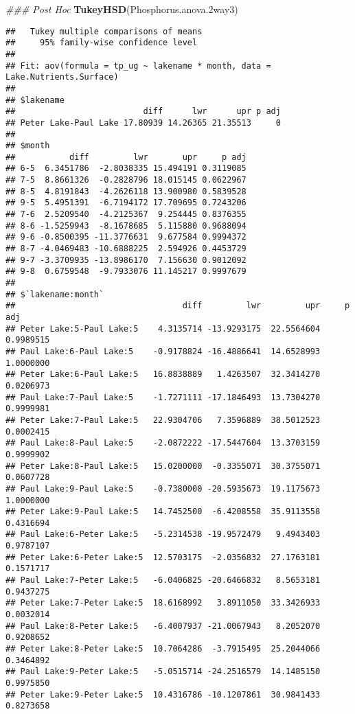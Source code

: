 \documentclass[]{article}
\newenvironment{Shaded}{\begin{snugshade}}{\end{snugshade}}
\newcommand{\CommentTok}[1]{\textcolor[rgb]{0.56,0.35,0.01}{\textit{#1}}}
\newcommand{\FloatTok}[1]{\textcolor[rgb]{0.00,0.00,0.81}{#1}}
\newcommand{\KeywordTok}[1]{\textcolor[rgb]{0.13,0.29,0.53}{\textbf{#1}}}
\newcommand{\NormalTok}[1]{#1}
\begin{document}
\begin{Shaded}
\begin{Highlighting}[]
\CommentTok{### Post Hoc}
\KeywordTok{TukeyHSD}\NormalTok{(Phosphorus.anova}\FloatTok{.2}\NormalTok{way3)}
\end{Highlighting}
\end{Shaded}

\begin{verbatim}
##   Tukey multiple comparisons of means
##     95% family-wise confidence level
## 
## Fit: aov(formula = tp_ug ~ lakename * month, data = Lake.Nutrients.Surface)
## 
## $lakename
##                          diff      lwr      upr p adj
## Peter Lake-Paul Lake 17.80939 14.26365 21.35513     0
## 
## $month
##           diff         lwr       upr     p adj
## 6-5  6.3451786  -2.8038335 15.494191 0.3119085
## 7-5  8.8661326  -0.2828796 18.015145 0.0622967
## 8-5  4.8191843  -4.2626118 13.900980 0.5839528
## 9-5  5.4951391  -6.7194172 17.709695 0.7243206
## 7-6  2.5209540  -4.2125367  9.254445 0.8376355
## 8-6 -1.5259943  -8.1678685  5.115880 0.9688094
## 9-6 -0.8500395 -11.3776631  9.677584 0.9994372
## 8-7 -4.0469483 -10.6888225  2.594926 0.4453729
## 9-7 -3.3709935 -13.8986170  7.156630 0.9012092
## 9-8  0.6759548  -9.7933076 11.145217 0.9997679
## 
## $`lakename:month`
##                                  diff         lwr         upr     p adj
## Peter Lake:5-Paul Lake:5    4.3135714 -13.9293175  22.5564604 0.9989515
## Paul Lake:6-Paul Lake:5    -0.9178824 -16.4886641  14.6528993 1.0000000
## Peter Lake:6-Paul Lake:5   16.8838889   1.4263507  32.3414270 0.0206973
## Paul Lake:7-Paul Lake:5    -1.7271111 -17.1846493  13.7304270 0.9999981
## Peter Lake:7-Paul Lake:5   22.9304706   7.3596889  38.5012523 0.0002415
## Paul Lake:8-Paul Lake:5    -2.0872222 -17.5447604  13.3703159 0.9999902
## Peter Lake:8-Paul Lake:5   15.0200000  -0.3355071  30.3755071 0.0607728
## Paul Lake:9-Paul Lake:5    -0.7380000 -20.5935673  19.1175673 1.0000000
## Peter Lake:9-Paul Lake:5   14.7452500  -6.4208558  35.9113558 0.4316694
## Paul Lake:6-Peter Lake:5   -5.2314538 -19.9572479   9.4943403 0.9787107
## Peter Lake:6-Peter Lake:5  12.5703175  -2.0356832  27.1763181 0.1571717
## Paul Lake:7-Peter Lake:5   -6.0406825 -20.6466832   8.5653181 0.9437275
## Peter Lake:7-Peter Lake:5  18.6168992   3.8911050  33.3426933 0.0032014
## Paul Lake:8-Peter Lake:5   -6.4007937 -21.0067943   8.2052070 0.9208652
## Peter Lake:8-Peter Lake:5  10.7064286  -3.7915495  25.2044066 0.3464892
## Paul Lake:9-Peter Lake:5   -5.0515714 -24.2516579  14.1485150 0.9975850
## Peter Lake:9-Peter Lake:5  10.4316786 -10.1207861  30.9841433 0.8273658

\end{verbatim}
\end{document}
